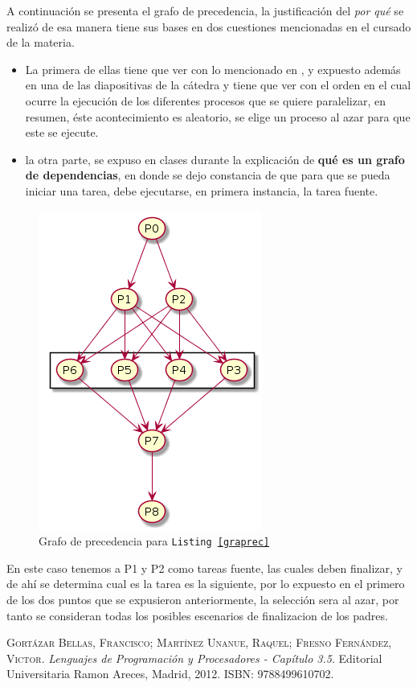 \documentclass{article}
\begin{document}
A continuaci\'on se presenta el grafo de precedencia, la justificaci\'on del \textit{por qu\'e} se realiz\'o de esa manera tiene  sus bases en dos cuestiones mencionadas en el cursado de la materia.
\begin{itemize}
\item La primera de ellas tiene que ver con lo mencionado en \cite{gortazarbellas}, y expuesto adem\'as en una de las diapositivas de la c\'atedra y tiene que ver con el orden en el cual ocurre la ejecuci\'on de los diferentes procesos que se quiere paralelizar, en resumen, \'este acontecimiento es aleatorio, se elige un proceso al azar para que este se ejecute.
\item la otra parte, se expuso en clases durante la explicaci\'on de \textbf{qu\'e es un grafo de dependencias}, en donde se dejo constancia de que para que se pueda iniciar una tarea, debe ejecutarse, en primera instancia, la tarea fuente.
\end{itemize}


\begin{figure}[H]
  \centering
  \includegraphics[width=.4\linewidth]{grafo_precedencia.png}
  \caption{Grafo de precedencia para \texttt{Listing \ref{graprec}}}
  \label{fig:graprec}
\end{figure}

En este caso tenemos a P1 y P2 como tareas fuente, las cuales deben finalizar, y de ah\'i se determina cual es la tarea es la siguiente, por lo expuesto en el primero de los dos puntos que se expusieron anteriormente, la selecci\'on sera al azar, por tanto se consideran todas los posibles escenarios de finalizacion de los padres.

\newpage
\begin{thebibliography}{99}
	\textsc{Gort\'azar Bellas, Francisco; Mart\'inez Unanue, Raquel; Fresno Fern\'andez, Victor}. \textit{Lenguajes de Programaci\'on y Procesadores - Cap\'itulo 3.5}. Editorial Universitaria Ramon Areces, Madrid, 2012. \textsc{ISBN: 9788499610702}.
\end{thebibliography}
\end{document}
